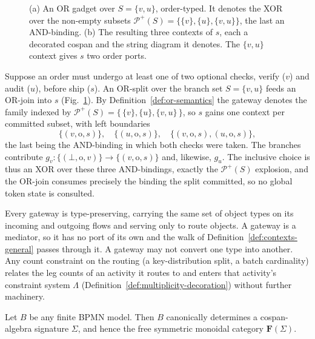 \begin{figure}[tp]
  \centering
  \resizebox{\textwidth}{!}{\unskip}
  \caption{(a) An OR gadget over $S=\{v,u\}$, order-typed. It denotes the XOR over the non-empty
    subsets $\mathcal{P}^+(S)=\{\{v\},\{u\},\{v,u\}\}$, the last an AND-binding. (b) The resulting
    three contexts of $s$, each a decorated cospan and the string diagram it denotes. The
    $\{v,u\}$ context gives $s$ two order ports.}
  \label{fig:re-bpmn-or}
\end{figure}

\begin{exmp}
  \label{ex:bpmn-or}
  Suppose an order must undergo at least one of two optional checks, verify
  ($v$) and audit ($u$), before ship ($s$). An OR-split over the branch
  set $S=\{v,u\}$ feeds an OR-join into $s$ (Fig.~\ref{fig:re-bpmn-or}). By
  Definition~\ref{def:or-semantics} the gateway denotes the family indexed by
  $\mathcal{P}^+(S)=\bigl\{\,\{v\},\{u\},\{v,u\}\,\bigr\}$, so $s$ gains one context per committed
  subset, with left boundaries
  \[
    \{(v,\mathrm{o},s)\},\quad \{(u,\mathrm{o},s)\},\quad
    \{(v,\mathrm{o},s),(u,\mathrm{o},s)\},
  \]
  the last being the AND-binding in which both checks were taken. The branches
  contribute $g_v:\{(\bot,\mathrm{o},v)\}\to\{(v,\mathrm{o},s)\}$ and, likewise,
  $g_u$. The inclusive choice is thus an XOR over these three AND-bindings, exactly the
  $\mathcal{P}^+(S)$ explosion, and the OR-join consumes precisely the binding the split
  committed, so no global token state is consulted.
\end{exmp}

\begin{remark}
  \label{rem:bpmn-typed-gateways}
  Every gateway is type-preserving, carrying the same set of object types on its incoming and
  outgoing flows and serving only to route objects. A gateway is a mediator, so it has no port of
  its own and the walk of Definition~\ref{def:contexts-general} passes through it. A gateway may not
  convert one type into another. Any count constraint on the routing (a key-distribution split, a
  batch cardinality) relates the leg counts of an activity it routes to and enters that activity's
  constraint system $\Lambda$ (Definition~\ref{def:multiplicity-decoration}) without further
  machinery.
\end{remark}

\begin{theorem}\label{thm:bpmn-cospan}
  Let $B$ be any finite BPMN model.
  Then $B$ canonically determines a cospan-algebra signature $\Sigma$, and hence the free
  symmetric monoidal category $\mathbf{F}(\Sigma)$.
\end{theorem}

